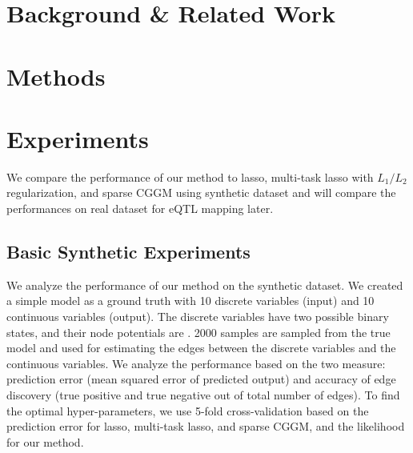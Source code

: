 \documentclass{article}
\begin{document}
\section{Background \& Related Work}
\label{LiteratureReview}

\section{Methods}

\section{Experiments}
We compare the performance of our method to lasso, multi-task lasso with $L_1/L_2$ regularization, and sparse CGGM using synthetic dataset and will compare the performances on real dataset for eQTL mapping later.

\subsection{Basic Synthetic Experiments}
We analyze the performance of our method on the synthetic dataset. We created a simple model as a ground truth with 10 discrete variables (input) and 10 continuous variables (output). The discrete variables have two possible binary states, and their node potentials are . 2000 samples are sampled from the true model and used for estimating the edges between the discrete variables and the continuous variables. We analyze the performance based on the two measure: prediction error (mean squared error of predicted output) and accuracy of edge discovery (true positive and true negative out of total number of edges). To find the optimal hyper-parameters, we use 5-fold cross-validation based on the prediction error for lasso, multi-task lasso, and sparse CGGM, and the likelihood for our method.
\end{document}
